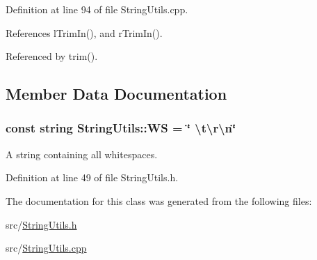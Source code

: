 Definition at line 94 of file String\-Utils.\-cpp.



References l\-Trim\-In(), and r\-Trim\-In().



Referenced by trim().



\subsection{Member Data Documentation}
\hypertarget{classStringUtils_a2abc03ce0e461cb7efca2166a12fd496}{
\subsubsection[{W\-S}]{\setlength{\rightskip}{0pt plus 5cm}const string String\-Utils\-::\-W\-S = \char`\"{} \textbackslash{}t\textbackslash{}r\textbackslash{}n\char`\"{}\hspace{0.3cm}{\ttfamily [static]}}}\label{classStringUtils_a2abc03ce0e461cb7efca2166a12fd496}


A string containing all whitespaces. 



Definition at line 49 of file String\-Utils.\-h.



The documentation for this class was generated from the following files\-:\begin{DoxyCompactItemize}
\item 
src/\hyperlink{StringUtils_8h}{String\-Utils.\-h}\item 
src/\hyperlink{StringUtils_8cpp}{String\-Utils.\-cpp}\end{DoxyCompactItemize}
